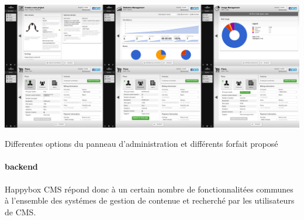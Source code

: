 \documentclass[11pt, a4paper ]{article}
\begin{document}
\begin{center}
	\includegraphics[width=\textwidth]{images/HBscreen/dash.png}
	\caption{Differentes options du panneau d'administration et différents forfait proposé}
\end{center}

\paragraph{backend}




Happybox CMS répond donc à un certain nombre de fonctionnalitées communes à l'ensemble des systémes de gestion de contenue et recherché par les utilisateurs de CMS\cite{enqueteCMSSmile}.
\end{document}
